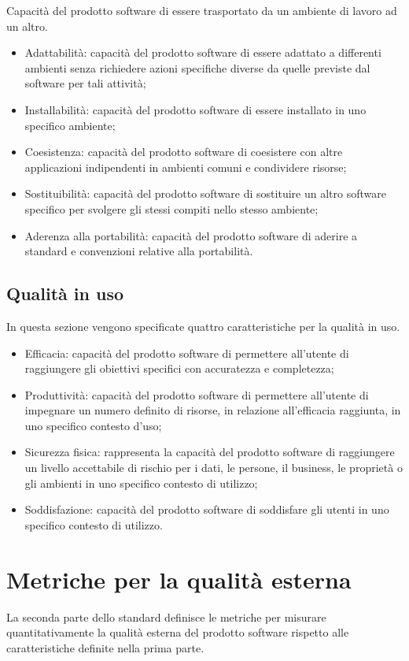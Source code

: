 Capacità del prodotto software di essere trasportato da un ambiente di lavoro ad un altro.

\begin{itemize}
    \item Adattabilità: capacità del prodotto software di essere adattato a differenti ambienti senza richiedere azioni specifiche diverse da quelle previste dal software per tali attività;
    \item Installabilità: capacità del prodotto software di essere installato in uno specifico ambiente;
    \item  Coesistenza: capacità del prodotto software di coesistere con altre applicazioni indipendenti in ambienti comuni e condividere risorse;
    \item Sostituibilità: capacità del prodotto software di sostituire un altro software specifico per svolgere gli stessi compiti nello stesso ambiente;
    \item Aderenza alla portabilità: capacità del prodotto software di aderire a standard e convenzioni relative alla portabilità.
\end{itemize}


\subsection{Qualità in uso}
In questa sezione vengono specificate quattro caratteristiche per la qualità in uso.

\begin{itemize}
    \item Efficacia: capacità del prodotto software di permettere all'utente di raggiungere gli obiettivi specifici con accuratezza e completezza;
    \item Produttività: capacità del prodotto software di permettere all'utente di impegnare un numero definito di risorse, in relazione all'efficacia raggiunta, in uno specifico contesto d'uso;
    \item Sicurezza fisica: rappresenta la capacità del prodotto software di raggiungere un livello accettabile di rischio per i dati, le persone, il business, le proprietà o gli ambienti in uno specifico contesto di utilizzo;
    \item  Soddisfazione: capacità del prodotto software di soddisfare gli utenti in uno specifico contesto di utilizzo.
\end{itemize}

\section{Metriche per la qualità esterna}
La seconda parte dello standard definisce le metriche per misurare quantitativamente la qualità esterna del prodotto software rispetto alle caratteristiche definite nella prima parte.

